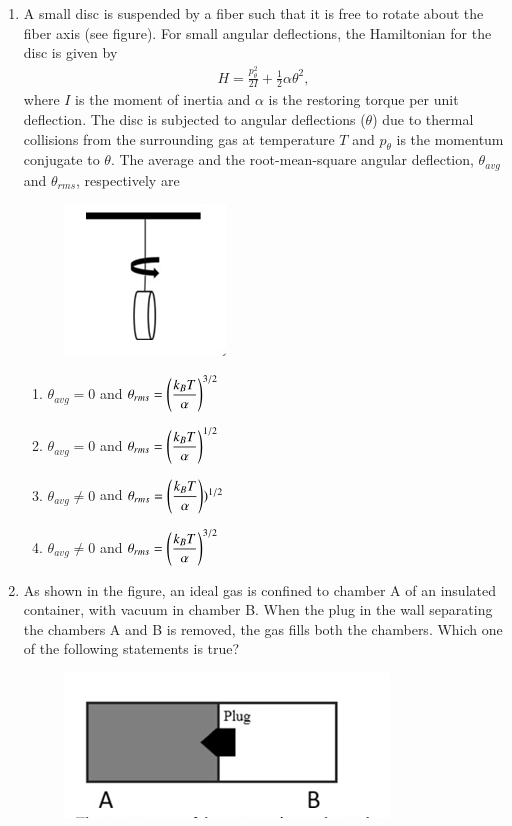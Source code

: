 \documentclass[journal,12pt,onecolumn]{IEEEtran}
\theoremstyle{remark}
\begin{document}
\begin{enumerate}
    \item A small disc is suspended by a fiber such that it is free to rotate about the fiber axis (see figure). For small angular deflections, the Hamiltonian for the disc is given by
    \begin{align}
        H = \frac{p_\theta^2}{2I} + \frac{1}{2}\alpha\theta^2,
    \end{align}
    where $I$ is the moment of inertia and $\alpha$ is the restoring torque per unit deflection. The disc is subjected to angular deflections ($\theta$) due to thermal collisions from the surrounding gas at temperature $T$ and $p_\theta$ is the momentum conjugate to $\theta$. The average and the root-mean-square angular deflection, $\theta_{avg}$ and $\theta_{{rms}}$, respectively are
\begin{figure}[H]
    \centering
    \includegraphics[width=0.25\columnwidth]{fig/Q15.png}
     \caption*{}
    \label{fig:Q15}
\end{figure}
  
    \begin{multicols}{2}
    \begin{enumerate}
        \item $\theta_{{avg}} = 0$ and $\theta_{{rms}} = \left(\dfrac{k_B T}{\alpha}\right)^{3/2}$
        \item $\theta_{{avg}} = 0$ and $\theta_{{rms}} = \left(\dfrac{k_B T}{\alpha}\right)^{1/2}$
        \item $\theta_{{avg}} \neq 0$ and $\theta_{{rms}} = \left(\dfrac{k_B T}{\alpha}\right))^{1/2}$
        \item $\theta_{{avg}} \neq 0$ and $\theta_{{rms}} = \left(\dfrac{k_B T}{\alpha}\right)^{3/2}$
    \end{enumerate}
    \end{multicols}
     \item As shown in the figure, an ideal gas is confined to chamber A of an insulated container, with vacuum in chamber B. When the plug in the wall separating the chambers A and B is removed, the gas fills both the chambers. Which one of the following statements is true?
     \begin{figure}[H]
    \centering
    \includegraphics[width=0.25\columnwidth]{fig/Q16.png}
     \caption*{}
    \label{fig:Q16}
\end{figure}
   

\end{enumerate}
\end{document}
